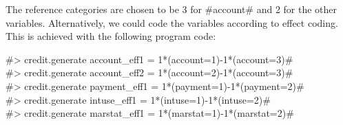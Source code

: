 The reference categories are chosen to be 3 for #account# and 2
for the other variables. Alternatively, we could code the
variables according to effect coding. This is achieved with the
following program code:

#> credit.generate account_eff1  = 1*(account=1)-1*(account=3)# \\
#> credit.generate account_eff2  = 1*(account=2)-1*(account=3)# \\
#> credit.generate payment_eff1 = 1*(payment=1)-1*(payment=2)# \\
#> credit.generate intuse_eff1 = 1*(intuse=1)-1*(intuse=2)# \\
#> credit.generate marstat_eff1 = 1*(marstat=1)-1*(marstat=2)#


